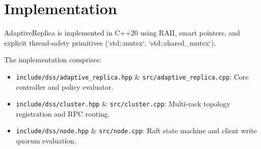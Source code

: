\section{Implementation}
\label{sec:implementation}

AdaptiveReplica is implemented in C++20 using RAII, smart pointers, and explicit thread-safety primitives (`std::mutex`, `std::shared_mutex`).

The implementation comprises:
\begin{itemize}
    \item \texttt{include/dss/adaptive\_replica.hpp} \& \texttt{src/adaptive\_replica.cpp}: Core controller and policy evaluator.
    \item \texttt{include/dss/cluster.hpp} \& \texttt{src/cluster.cpp}: Multi-rack topology registration and RPC routing.
    \item \texttt{include/dss/node.hpp} \& \texttt{src/node.cpp}: Raft state machine and client write quorum evaluation.
\end{itemize}
